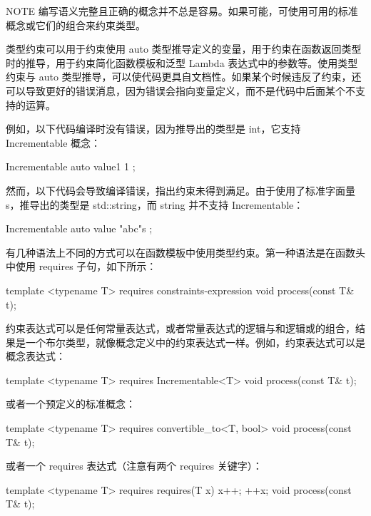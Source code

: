 \begin{myNotic}{NOTE}
编写语义完整且正确的概念并不总是容易。如果可能，可使用可用的标准概念或它们的组合来约束类型。
\end{myNotic}


类型约束可以用于约束使用 auto 类型推导定义的变量，用于约束在函数返回类型时的推导，用于约束简化函数模板和泛型 Lambda 表达式中的参数等。使用类型约束与 auto 类型推导，可以使代码更具自文档性。如果某个时候违反了约束，还可以导致更好的错误消息，因为错误会指向变量定义，而不是代码中后面某个不支持的运算。

例如，以下代码编译时没有错误，因为推导出的类型是 int，它支持 Incrementable 概念：

\begin{cpp}
Incrementable auto value1 { 1 };
\end{cpp}

然而，以下代码会导致编译错误，指出约束未得到满足。由于使用了标准字面量 s，推导出的类型是 std::string，而 string 并不支持 Incrementable：

\begin{cpp}
Incrementable auto value { "abc"s };
\end{cpp}


有几种语法上不同的方式可以在函数模板中使用类型约束。第一种语法是在函数头中使用 requires 子句，如下所示：

\begin{cpp}
template <typename T> requires constraints-expression
void process(const T& t);
\end{cpp}

约束表达式可以是任何常量表达式，或者常量表达式的逻辑与和逻辑或的组合，结果是一个布尔类型，就像概念定义中的约束表达式一样。例如，约束表达式可以是概念表达式：

\begin{cpp}
template <typename T> requires Incrementable<T>
void process(const T& t);
\end{cpp}

或者一个预定义的标准概念：

\begin{cpp}
template <typename T> requires convertible_to<T, bool>
void process(const T& t);
\end{cpp}

或者一个 requires 表达式（注意有两个 requires 关键字）：

\begin{cpp}
template <typename T> requires requires(T x) { x++; ++x; }
void process(const T& t);
\end{cpp}

